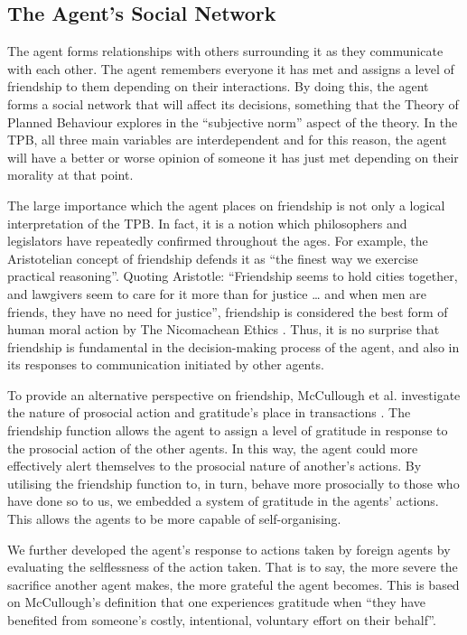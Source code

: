 \subsection{The Agent’s Social Network}
The agent forms relationships with others surrounding it as they communicate with each other. The agent remembers everyone it has met and assigns a level of friendship to them depending on their interactions. By doing this, the agent forms a social network that will affect its decisions, something that the Theory of Planned Behaviour explores in the “subjective norm” aspect of the theory. In the TPB,  all three main variables are interdependent and for this reason, the agent will have a better or worse opinion of someone it has just met depending on their morality at that point. \par
The large importance which the agent places on friendship is not only a logical interpretation of the TPB. In fact, it is a notion which philosophers and legislators have repeatedly confirmed throughout the ages. For example, the Aristotelian concept of friendship defends it as “the finest way we exercise practical reasoning”. Quoting Aristotle: “Friendship seems to hold cities together, and lawgivers seem to care for it more than for justice … and when men are friends, they have no need for justice”, friendship is considered the best form of human moral action by The Nicomachean Ethics \cite{sokolowski}. Thus, it is no surprise that friendship is fundamental in the decision-making process of the agent, and also in its responses to communication initiated by other agents. \par 
To provide an alternative perspective on friendship, McCullough et al. investigate the nature of prosocial action and gratitude’s place in transactions \cite{doi:10.1111/j.1467-8721.2008.00590.x}. The friendship function allows the agent to assign a level of gratitude in response to the prosocial action of the other agents. In this way, the agent could more effectively alert themselves to the prosocial nature of another’s actions. By utilising the friendship function to, in turn, behave more prosocially to those who have done so to us, we embedded a system of gratitude in the agents’ actions. This allows the agents to be more capable of self-organising.\par 
We further developed the agent's response to actions taken by foreign agents by evaluating the selflessness of the action taken. That is to say, the more severe the sacrifice another agent makes, the more grateful the agent becomes. This is based on McCullough’s definition that one experiences gratitude when “they have benefited from someone’s costly, intentional, voluntary effort on their behalf”. \par 
